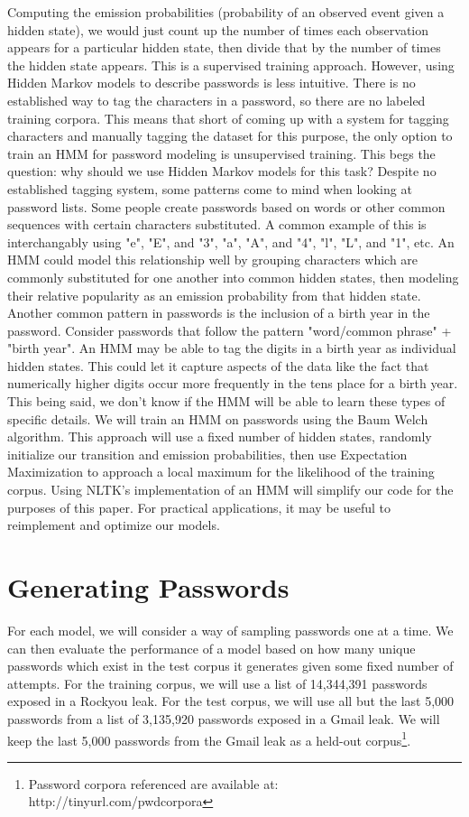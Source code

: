 \documentclass{amsart}
\theoremstyle{definition}
\theoremstyle{remark}
\numberwithin{equation}{section}
\begin{document}
Computing the emission probabilities (probability of an observed event given a hidden state), we would just count up the number of times each observation appears for a particular hidden state, then divide that by the number of times the hidden state appears. This is a supervised training approach. However, using Hidden Markov models to describe passwords is less intuitive. There is no established way to tag the characters in a password, so there are no labeled training corpora. This means that short of coming up with a system for tagging characters and manually tagging the dataset for this purpose, the only option to train an HMM for password modeling is unsupervised training. This begs the question: why should we use Hidden Markov models for this task? Despite no established tagging system, some patterns come to mind when looking at password lists. Some people create passwords based on words or other common sequences with certain characters substituted. A common example of this is interchangably using "e", "E", and "3", "a", "A", and "4", "l", "L", and "1", etc. An HMM could model this relationship well by grouping characters which are commonly substituted for one another into common hidden states, then modeling their relative popularity as an emission probability from that hidden state. Another common pattern in passwords is the inclusion of a birth year in the password. Consider passwords that follow the pattern "word/common phrase" + "birth year". An HMM may be able to tag the digits in a birth year as individual hidden states. This could let it capture aspects of the data like the fact that numerically higher digits occur more frequently in the tens place for a birth year. This being said, we don't know if the HMM will be able to learn these types of specific details. We will train an HMM on passwords using the Baum Welch algorithm. This approach will use a fixed number of hidden states, randomly initialize our transition and emission probabilities, then use Expectation Maximization to approach a local maximum for the likelihood of the training corpus. Using NLTK's implementation of an HMM will simplify our code for the purposes of this paper. For practical applications, it may be useful to reimplement and optimize our models.


\section{Generating Passwords}
For each model, we will consider a way of sampling passwords one at a time. We can then evaluate the performance of a model based on how many unique passwords which exist in the test corpus it generates given some fixed number of attempts. For the training corpus, we will use a list of 14,344,391 passwords exposed in a Rockyou leak. For the test corpus, we will use all but the last 5,000 passwords from a list of 3,135,920 passwords exposed in a Gmail leak. We will keep the last 5,000 passwords from the Gmail leak as a held-out corpus\footnote{Password corpora referenced are available at: http://tinyurl.com/pwdcorpora}.
\end{document}
